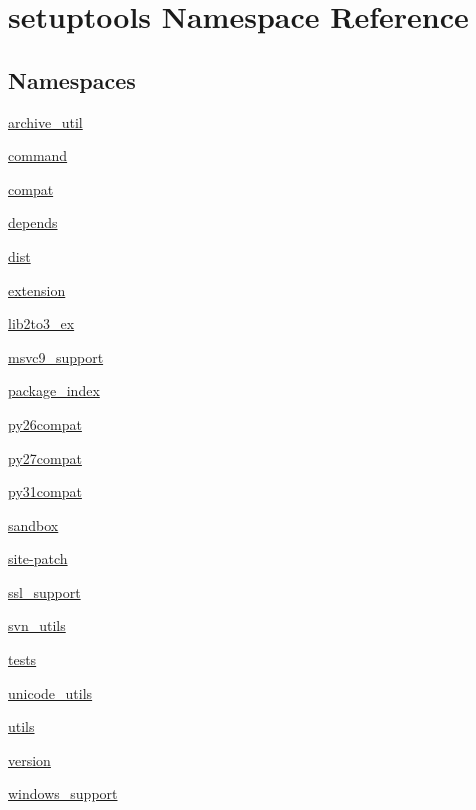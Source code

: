 \hypertarget{namespacesetuptools}{}\section{setuptools Namespace Reference}
\label{namespacesetuptools}
\subsection*{Namespaces}
\begin{DoxyCompactItemize}
\item 
 \hyperlink{namespacesetuptools_1_1archive__util}{archive\+\_\+util}
\item 
 \hyperlink{namespacesetuptools_1_1command}{command}
\item 
 \hyperlink{namespacesetuptools_1_1compat}{compat}
\item 
 \hyperlink{namespacesetuptools_1_1depends}{depends}
\item 
 \hyperlink{namespacesetuptools_1_1dist}{dist}
\item 
 \hyperlink{namespacesetuptools_1_1extension}{extension}
\item 
 \hyperlink{namespacesetuptools_1_1lib2to3__ex}{lib2to3\+\_\+ex}
\item 
 \hyperlink{namespacesetuptools_1_1msvc9__support}{msvc9\+\_\+support}
\item 
 \hyperlink{namespacesetuptools_1_1package__index}{package\+\_\+index}
\item 
 \hyperlink{namespacesetuptools_1_1py26compat}{py26compat}
\item 
 \hyperlink{namespacesetuptools_1_1py27compat}{py27compat}
\item 
 \hyperlink{namespacesetuptools_1_1py31compat}{py31compat}
\item 
 \hyperlink{namespacesetuptools_1_1sandbox}{sandbox}
\item 
 \hyperlink{namespacesetuptools_1_1site-patch}{site-\/patch}
\item 
 \hyperlink{namespacesetuptools_1_1ssl__support}{ssl\+\_\+support}
\item 
 \hyperlink{namespacesetuptools_1_1svn__utils}{svn\+\_\+utils}
\item 
 \hyperlink{namespacesetuptools_1_1tests}{tests}
\item 
 \hyperlink{namespacesetuptools_1_1unicode__utils}{unicode\+\_\+utils}
\item 
 \hyperlink{namespacesetuptools_1_1utils}{utils}
\item 
 \hyperlink{namespacesetuptools_1_1version}{version}
\item 
 \hyperlink{namespacesetuptools_1_1windows__support}{windows\+\_\+support}
\end{DoxyCompactItemize}
